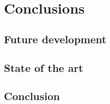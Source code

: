 \chapter{Conclusions}

\section{Future development}

\section{State of the art}

\section{Conclusion}